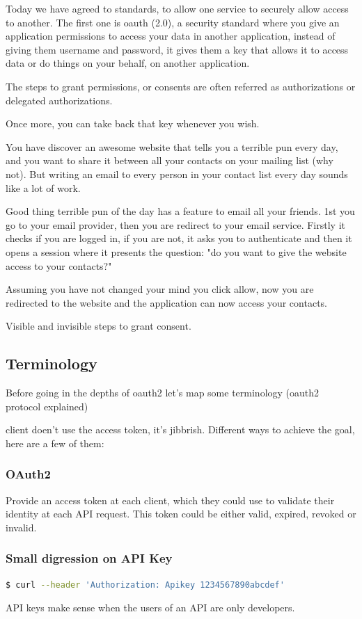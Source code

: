 \documentclass[11pt]{style}
\begin{document}
Today we have agreed to standards, to allow one service to securely allow access
to another.
The first one is oauth (2.0), a security standard where you give an application
permissions to access your data in another application, instead of giving them
username and password, it gives them a key that allows it to access data or do
things on your behalf, on another application.

The steps to grant permissions, or consents are often referred as authorizations
or delegated authorizations.

Once more, you can take back that key whenever you wish.

You have discover an awesome website that tells you a terrible pun every day,
and you want to share it between all your contacts on your mailing list (why
not).
But writing an email to every person in your contact list every day sounds like
a lot of work.

Good thing terrible pun of the day has a feature to email all your friends.
1st you go to your email provider, then you are redirect to your email service.
Firstly it checks if you are logged in, if you are not, it asks you to
authenticate and then it opens a session where it presents the question: "do you
want to give the website access to your contacts?"

Assuming you have not changed your mind you click allow, now you are redirected
to the website and the application can now access your contacts.

Visible and invisible steps to grant consent.
\subsection{Terminology}
Before going in the depths of oauth2 let's map some terminology
(oauth2 protocol explained)

client doen't use the access token, it's jibbrish.
Different ways to achieve the goal, here are a few of them:


\subsubsection{OAuth2}
Provide an access token at each client, which they could use to validate their
identity at each API request.  This token could be either valid, expired,
revoked or invalid.

\subsubsection{Small digression on API Key}
\begin{lstlisting}[language=bash]
$ curl --header 'Authorization: Apikey 1234567890abcdef'
\end{lstlisting}
API keys make sense when the users of an API are only developers.
\end{document}
